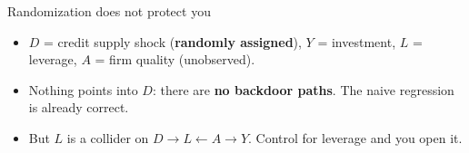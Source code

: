 \documentclass[
  11pt,
  ignorenonframetext,
  aspectratio=169,
]{beamer}
\providecommand{\tightlist}{%
  \setlength{\itemsep}{0pt}\setlength{\parskip}{0pt}}
\begin{document}
\begin{frame}{Randomization does not protect you}
\protect{}\label{randomization-does-not-protect-you}
\begin{center}
\end{center}

\begin{itemize}
\tightlist
\item
  \(D\) = credit supply shock (\textbf{randomly assigned}), \(Y\) =
  investment, \(L\) = leverage, \(A\) = firm quality (unobserved).
\item
  Nothing points into \(D\): there are \textbf{no backdoor paths}. The
  naive regression is already correct.
\item
  But \(L\) is a collider on \(D \to L \leftarrow A \to Y\). Control for
  leverage and you open it.
\end{itemize}
\end{frame}
\end{document}

